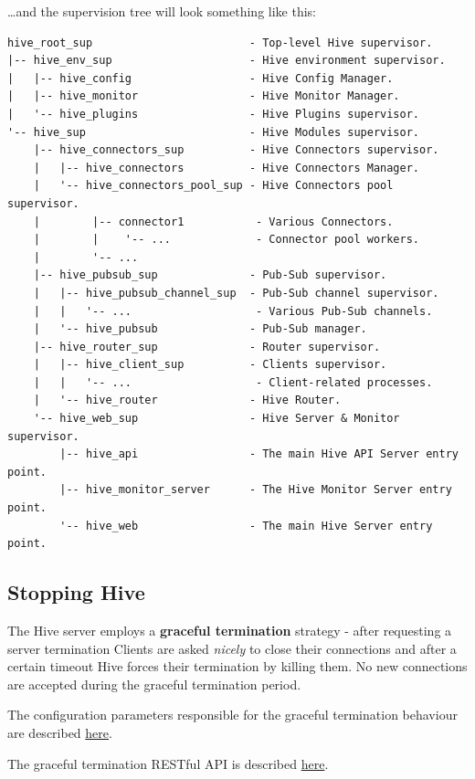 \documentclass[a4paper]{article}
\begin{document}
\noindent
\ldots{}and the supervision tree will look something like this:


\begin{verbatim}
hive_root_sup                        - Top-level Hive supervisor.
|-- hive_env_sup                     - Hive environment supervisor.
|   |-- hive_config                  - Hive Config Manager.
|   |-- hive_monitor                 - Hive Monitor Manager.
|   '-- hive_plugins                 - Hive Plugins supervisor.
'-- hive_sup                         - Hive Modules supervisor.
    |-- hive_connectors_sup          - Hive Connectors supervisor.
    |   |-- hive_connectors          - Hive Connectors Manager.
    |   '-- hive_connectors_pool_sup - Hive Connectors pool supervisor.
    |        |-- connector1           - Various Connectors.
    |        |    '-- ...             - Connector pool workers.
    |        '-- ...
    |-- hive_pubsub_sup              - Pub-Sub supervisor.
    |   |-- hive_pubsub_channel_sup  - Pub-Sub channel supervisor.
    |   |   '-- ...                   - Various Pub-Sub channels.
    |   '-- hive_pubsub              - Pub-Sub manager.
    |-- hive_router_sup              - Router supervisor.
    |   |-- hive_client_sup          - Clients supervisor.
    |   |   '-- ...                   - Client-related processes.
    |   '-- hive_router              - Hive Router.
    '-- hive_web_sup                 - Hive Server & Monitor supervisor.
        |-- hive_api                 - The main Hive API Server entry point.
        |-- hive_monitor_server      - The Hive Monitor Server entry point.
        '-- hive_web                 - The main Hive Server entry point.
\end{verbatim}
\subsection{Stopping Hive}
\label{sec-2-4}

The Hive server employs a \textbf{graceful termination} strategy - after requesting a server termination Clients are asked \emph{nicely} to close their connections and after a certain timeout Hive forces their termination by killing them. No new connections are accepted during the graceful termination period.

\noindent
The configuration parameters responsible for the graceful termination behaviour are described \hyperref[ref-graceful_config]{here}.

\noindent
The graceful termination RESTful API is described \hyperref[sec-6-1-1]{here}.
\end{document}
